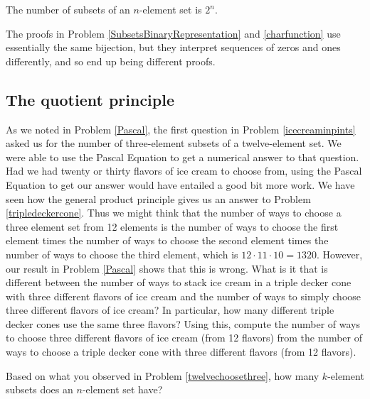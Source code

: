 \begin{theorem} The number of subsets of an $n$-element set is
$2^n$.
\end{theorem}


The proofs in Problem \ref{SubsetsBinaryRepresentation} and
\ref{charfunction} use essentially the same bijection, but they interpret
sequences of zeros and ones differently, and so end up being different proofs.


\subsection{The quotient principle}

\bp
\iteme As we noted in Problem \ref{Pascal}, the first question in
Problem \ref{icecreaminpints} asked us for the number of three-element
subsets of a twelve-element set.  We were able to use the Pascal Equation to
get a numerical answer to that question.  Had we had twenty or thirty flavors
of ice cream to choose from, using the Pascal Equation to get our answer
would have entailed a good bit more work. We have seen how the general
product principle gives us an answer to Problem \ref{tripledeckercone}.  Thus
we might think that the number of ways to choose a three element set from 12
elements is the number of ways to choose the first element times the number
of ways to choose the second element times the number of ways to choose the
third element, which is $12\cdot11\cdot10=1320$.  However, our result in
Problem \ref{Pascal} shows that this is wrong.  What is it that is different
between the number of ways to stack ice cream in  a triple decker cone with
three different flavors of ice cream and the number of ways to simply choose
three different flavors of ice cream?  In particular, how many different
triple decker cones use the same three flavors?  Using this, compute the
number of ways to choose three different flavors of ice cream (from 12
flavors) from the number of ways to choose a triple decker cone with three
different flavors (from 12 flavors).\label{twelvechoosethree}

\iteme  Based on what you observed in Problem
\ref{twelvechoosethree}, how many $k$-element subsets does an
$n$-element set have?\label{nchoosek}

